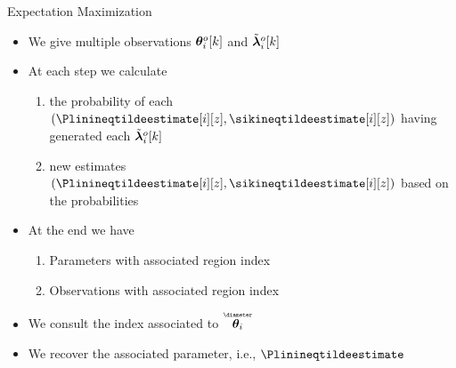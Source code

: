 \documentclass[aspectratio=169]{beamer}
\begin{document}
\begin{frame}{Expectation Maximization}

  \begin{itemize}[<+(1)->]
    \item We give multiple observations $\boldsymbol{\theta}_{i}^{o}[k]$ and $\tilde{\boldsymbol{\lambda}}_{i}^{o}[k]$
    \item At each step we calculate
          \begin{enumerate}
            \item[\encircle{E}] the probability of each $(\Plinineqtildeestimate[i][z],\sikineqtildeestimate[i][z])$ having generated each $\tilde{\boldsymbol{\lambda}}_{i}^{o}[k]$
            \item[\encircle{M}] new estimates $(\Plinineqtildeestimate[i][z],\sikineqtildeestimate[i][z])$ based on the probabilities
          \end{enumerate}
  \end{itemize}

  \begin{itemize}[<+(1)->]
    \item At the end we have
          \begin{enumerate}
            \item Parameters with associated region index
            \item Observations with associated region index
          \end{enumerate}
    \item We consult the index associated to $\thetairestricted$
    \item We recover the associated parameter, i.e., $\Plinineqtildeestimate$
  \end{itemize}
\end{frame}
\end{document}
